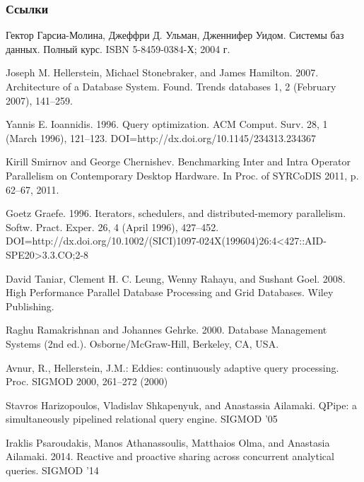 \documentclass{beamer}
\begin{document}
\begin{frame}[allowframebreaks]
\frametitle{Ссылки}
\footnotesize{
\begin{thebibliography}{99}

 Гектор Гарсиа-Молина, Джеффри Д. Ульман, Дженнифер Уидом. Системы баз данных. Полный курс.  ISBN 5-8459-0384-Х; 2004 г. 

 Joseph M. Hellerstein, Michael Stonebraker, and James Hamilton. 2007. Architecture of a Database System. Found. Trends databases 1, 2 (February 2007), 141--259. 

 Yannis E. Ioannidis. 1996. Query optimization. ACM Comput. Surv. 28, 1 (March 1996), 121--123. DOI=http://dx.doi.org/10.1145/234313.234367 

 Kirill Smirnov and George Chernishev. Benchmarking Inter and Intra Operator Parallelism on Contemporary Desktop Hardware. In Proc. of SYRCoDIS 2011, p. 62--67, 2011.

 Goetz Graefe. 1996. Iterators, schedulers, and distributed-memory parallelism. Softw. Pract. Exper. 26, 4 (April 1996), 427--452. DOI=http://dx.doi.org/10.1002/(SICI)1097-024X(199604)26:4<427::AID-SPE20>3.3.CO;2-8 

 David Taniar, Clement H. C. Leung, Wenny Rahayu, and Sushant Goel. 2008. High Performance Parallel Database Processing and Grid Databases. Wiley Publishing. 

  Raghu Ramakrishnan and Johannes Gehrke. 2000. Database Management Systems (2nd ed.). Osborne/McGraw-Hill, Berkeley, CA, USA. 

 Avnur, R., Hellerstein, J.M.: Eddies: continuously adaptive query processing. Proc. SIGMOD 2000, 261–272 (2000)

 Stavros Harizopoulos, Vladislav Shkapenyuk, and Anastassia Ailamaki. QPipe: a simultaneously pipelined relational query engine. SIGMOD ’05

 Iraklis Psaroudakis, Manos Athanassoulis, Matthaios Olma, and Anastasia Ailamaki. 2014. Reactive and proactive sharing across concurrent analytical queries. SIGMOD ’14


\end{thebibliography}}
\end{frame}
\end{document}
